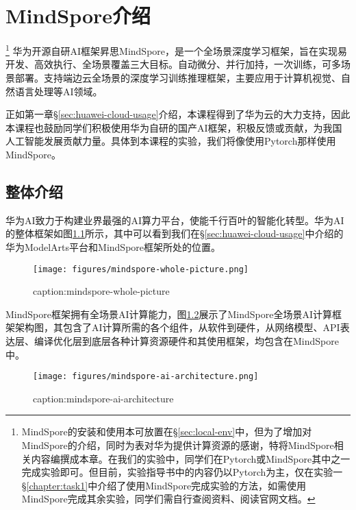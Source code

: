 \chapter{MindSpore介绍}

\footnote{MindSpore的安装和使用本可放置在\S\ref{sec:local-env}中，但为了增加对MindSpore的介绍，同时为表对华为提供计算资源的感谢，特将MindSpore相关内容编撰成本章。在我们的实验中，同学们在Pytorch或MindSpore其中之一完成实验即可。但目前，实验指导书中的内容仍以Pytorch为主，仅在实验一\S\ref{chapter:task1}中介绍了使用MindSpore完成实验的方法，如需使用MindSpore完成其余实验，同学们需自行查阅资料、阅读官网文档。}
华为开源自研AI框架昇思MindSpore，是一个全场景深度学习框架，旨在实现易开发、高效执行、全场景覆盖三大目标。自动微分、并行加持，一次训练，可多场景部署。支持端边云全场景的深度学习训练推理框架，主要应用于计算机视觉、自然语言处理等AI领域。

正如第一章\S\ref{sec:huawei-cloud-usage}介绍，本课程得到了华为云的大力支持，因此本课程也鼓励同学们积极使用华为自研的国产AI框架，积极反馈或贡献，为我国人工智能发展贡献力量。具体到本课程的实验，我们将像使用Pytorch那样使用MindSpore。



\section{整体介绍}

华为AI致力于构建业界最强的AI算力平台，使能千行百叶的智能化转型。华为AI的整体框架如图\ref{fig:mindspore-whole-picture}所示，其中可以看到我们在\S\ref{sec:huawei-cloud-usage}中介绍的华为ModelArts平台和MindSpore框架所处的位置。
\begin{figure}[htbp]
	\centering
	\texttt{[image: figures/mindspore-whole-picture.png]}
	\caption{caption:mindspore-whole-picture}
	\label{fig:mindspore-whole-picture}
\end{figure}

MindSpore框架拥有全场景AI计算能力，图\ref{fig:mindspore-ai-architecture}展示了MindSpore全场景AI计算框架架构图，其包含了AI计算所需的各个组件，从软件到硬件，从网络模型、API表达层、编译优化层到底层各种计算资源硬件和其使用框架，均包含在MindSpore中。

\begin{figure}[htbp]
	\centering
	\texttt{[image: figures/mindspore-ai-architecture.png]}
	\caption{caption:mindspore-ai-architecture}
	\label{fig:mindspore-ai-architecture}
\end{figure}


